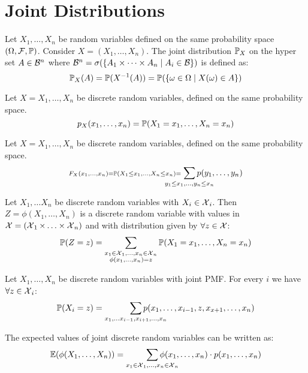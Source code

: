 \section{Joint Distributions}
\begin{definition*}
  Let \(X_1, \ldots, X_n\) be random variables defined on the same probability space \((\O, \F, \P)\). Consider \(X = (X_1, \ldots, X_n)\). The joint distribution \(\P_X\) on the hyper set \(A \in \B^n\) where \(\B^n = \sigma(\{A_1 \times \cdots \times A_n \mid A_i \in \B\})\) is defined as:
  \[\P_X(A) = \P(X^{-1}(A)) = \P(\{\omega \in \O \mid X(\omega) \in A\})\]
\end{definition*}

\begin{ddefinition*}
  Let \(X = X_1, \ldots, X_n\) be discrete random variables, defined on the same probability space.
  \[p_{X}(x_1, \ldots, x_n) = \P(X_1 = x_1, \ldots, X_n = x_n)\]
\end{ddefinition*}

\begin{ddefinition*}
  Let \(X = X_1, \ldots, X_n\) be discrete random variables, defined on the same probability space.
  \[\scriptstyle F_X(x_1, \ldots, x_n) = \P(X_1 \leq x_1, \ldots, X_n \leq x_n) = \smashoperator{\sum_{y_1 \leq x_1, \ldots, y_n \leq x_n}} p(y_1, \ldots, y_n)\]
\end{ddefinition*}

\begin{proposition}
  Let \(X_1, \ldots X_n\) be discrete random variables with \(X_i \in \DX_i\). Then \(Z = \phi(X_1, \ldots, X_n)\) is a discrete random variable with values in \(\DX = (\DX_1 \times \ldots \times \DX_n)\) and with distribution given by \(\forall z \in \DX\):
  \[\P(Z = z) = \sum_{\substack{x_1 \in \DX_1, \ldots, x_n \in \DX_n \\ \phi(x_1, \ldots, x_n) = z}} \P(X_1 = x_1, \ldots, X_n = x_n)\]
\end{proposition}

\begin{dtheorem*}
  Let \(X_1, \ldots, X_n\) be discrete random variables with joint PMF. For every \(i\) we have \(\forall z \in \DX_i\):
  \[\P(X_i = z) = \smashoperator[r]{\sum_{x_1, \ldots x_{i-1}, x_{i+1}, \ldots, x_n}} p(x_1, \ldots, x_{i-1}, z, x_{x+1}, \ldots, x_n)\]
\end{dtheorem*}

\begin{proposition}
  The expected values of joint discrete random variables can be written as:
  \[\E(\phi(X_1, \ldots, X_n)) = \smashoperator[r]{\sum_{x_1 \in \DX_1, \ldots, x_n \in \DX_n}} \phi(x_1, \ldots, x_n) \cdot p(x_1, \ldots, x_n)\]
\end{proposition}

